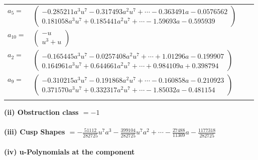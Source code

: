 \documentclass[1p]{elsarticle_modified}
\theoremstyle{definition}
\begin{document}
\begin{tabular}{m{7pt} m{180pt} m{7pt} m{180pt} }
\flushright $a_{5}=$&$\begin{pmatrix}-0.285211 a^{3} u^{7}-0.317493 a^{2} u^{7}+\cdots-0.363491 a-0.0576562\\0.181058 a^{3} u^{7}+0.185441 a^{2} u^{7}+\cdots-1.59693 a-0.595939\end{pmatrix}$ \\
\flushright $a_{10}=$&$\begin{pmatrix}- u\\u^3+u\end{pmatrix}$ \\
\flushright $a_{2}=$&$\begin{pmatrix}-0.165445 a^{3} u^{7}-0.0257408 a^{2} u^{7}+\cdots+1.01296 a-0.199907\\0.164961 a^{3} u^{7}+0.644661 a^{2} u^{7}+\cdots+0.984109 a+0.398794\end{pmatrix}$ \\
\flushright $a_{9}=$&$\begin{pmatrix}-0.310215 a^{3} u^{7}-0.191868 a^{2} u^{7}+\cdots-0.160858 a-0.210923\\0.371570 a^{3} u^{7}+0.332317 a^{2} u^{7}+\cdots-1.85032 a-0.481154\end{pmatrix}$\\&\end{tabular}
\flushleft \textbf{(ii) Obstruction class $= -1$}\\~\\
\flushleft \textbf{(iii) Cusp Shapes $= -\frac{51112}{282725} u^7 a^3-\frac{399104}{282725} u^7 a^2+\cdots-\frac{27488}{11309} a-\frac{1177318}{282725}$}\\~\\
\newpage\renewcommand{\arraystretch}{1}
\flushleft \textbf{(iv) u-Polynomials at the component}\newline \\
\end{document}
